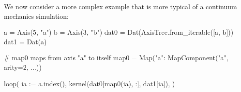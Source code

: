 \documentclass[thesis]{subfiles}
\begin{document}
\begin{example}  %


We now consider a more complex example that is more typical of a continuum mechanics simulation:

\begin{pyinline}
  a = Axis(5, "a")
  b = Axis(3, "b")
  dat0 = Dat(AxisTree.from_iterable([a, b]))
  dat1 = Dat(a)

  # map0 maps from axis "a" to itself
  map0 = Map({"a": MapComponent("a", arity=2, ...)})

  loop(
    ia := a.index(),
    kernel(dat0[map0(ia), :], dat1[ia]),
  )
\end{pyinline}



%
%
%


\begin{table}
  \centering


\end{table}
\end{example}
\end{document}
